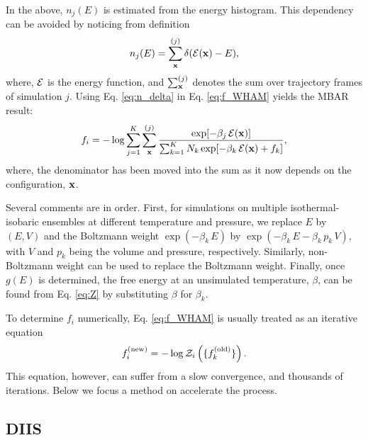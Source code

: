 \documentclass[aip,jcp,preprint,superscriptaddress]{revtex4-1}
\begin{document}
In the above,
$n_j(E)$ is estimated from the energy histogram.
%
This dependency can be avoided
by noticing from definition
%
\begin{equation}
n_j(E)
=
\sum_{\mathbf{x}}^{(j)} \delta(\mathcal{E}(\mathbf{x}) - E),
\label{eq:n_delta}
\end{equation}
%
where,
$\mathcal{E}$
is the energy function,
and
$\sum_{\mathbf{x}}^{(j)}$
denotes the sum over trajectory frames
of simulation $j$.
%
%
%
Using Eq. \eqref{eq:n_delta} in Eq. \eqref{eq:f_WHAM} yields
the MBAR\cite{shirts2008} result:
%
\begin{equation}
f_i
=
-\log
\sum_{j = 1}^K
\sum_{\mathbf{x}}^{(j)}
\frac{
  \exp[-\beta_j \, \mathcal{E}(\mathbf{x})]
}
{
  \sum_{k = 1}^K N_k \exp[-\beta_k \, \mathcal{E}(\mathbf{x}) + f_k]
},
\label{eq:f_MBAR}
\end{equation}
%
where,
the denominator has been moved into the sum
as it now depends on the configuration, $\mathbf{x}$.



Several comments are in order.
%
First,
for simulations on multiple isothermal-isobaric ensembles
at different temperature and pressure,
%
we replace $E$ by $(E, V)$
and the Boltzmann weight
$\exp(-\beta_k \, E)$
by
$\exp(-\beta_k \, E - \beta_k \, p_k \, V)$,
with
$V$ and $p_k$
being the volume and pressure,
respectively.
%
Similarly,
non-Boltzmann weight\cite{
mezei1987, *berg1992, *lee1993, *tsallis1988}
can be used to replace the Boltzmann weight.
%
Finally,
once $g(E)$ is determined,
the free energy at an unsimulated temperature, $\beta$,
can be found from Eq. \eqref{eq:Z}
by substituting $\beta$ for $\beta_k$.


To determine $f_i$ numerically,
Eq. \eqref{eq:f_WHAM}
is usually treated as an iterative equation
%
\begin{equation}
f_i^\mathrm{(new)}
=
-\log \mathcal{Z}_i\left(
  \{ f_k^\mathrm{(old)} \}
\right).
\end{equation}
%
This equation, however,
can suffer from a slow convergence,
and thousands of iterations\cite{
bereau2009, kim2011}.
%
Below we focus a method on accelerate the process.



\subsection{DIIS}
\end{document}
